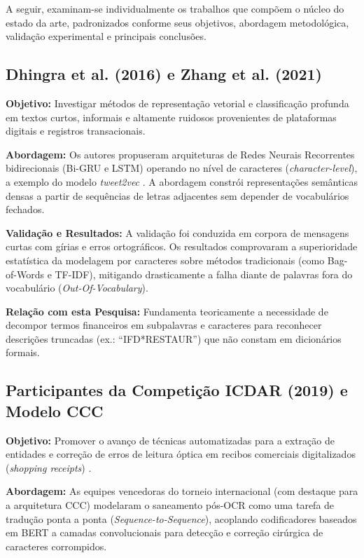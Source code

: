 \documentclass[
	12pt,				
	openright,			
	oneside,			
	a4paper,			
	english,			
	brazil				
	]{abntex2}
\begin{document}
A seguir, examinam-se individualmente os trabalhos que compõem o núcleo do estado da arte, padronizados conforme seus objetivos, abordagem metodológica, validação experimental e principais conclusões.

\subsection{Dhingra et al. (2016) e Zhang et al. (2021)}
\textbf{Objetivo:} Investigar métodos de representação vetorial e classificação profunda em textos curtos, informais e altamente ruidosos provenientes de plataformas digitais e registros transacionais.

\textbf{Abordagem:} Os autores propuseram arquiteturas de Redes Neurais Recorrentes bidirecionais (Bi-GRU e LSTM) operando no nível de caracteres (\textit{character-level}), a exemplo do modelo \textit{tweet2vec} \cite{dhingra2016tweet2vec, zhang2021mineracao}. A abordagem constrói representações semânticas densas a partir de sequências de letras adjacentes sem depender de vocabulários fechados.

\textbf{Validação e Resultados:} A validação foi conduzida em corpora de mensagens curtas com gírias e erros ortográficos. Os resultados comprovaram a superioridade estatística da modelagem por caracteres sobre métodos tradicionais (como Bag-of-Words e TF-IDF), mitigando drasticamente a falha diante de palavras fora do vocabulário (\textit{Out-Of-Vocabulary}). 

\textbf{Relação com esta Pesquisa:} Fundamenta teoricamente a necessidade de decompor termos financeiros em subpalavras e caracteres para reconhecer descrições truncadas (ex.: ``IFD*RESTAUR'') que não constam em dicionários formais.

\subsection{Participantes da Competição ICDAR (2019) e Modelo CCC}
\textbf{Objetivo:} Promover o avanço de técnicas automatizadas para a extração de entidades e correção de erros de leitura óptica em recibos comerciais digitalizados (\textit{shopping receipts}) \cite{icdar2019competition}.

\textbf{Abordagem:} As equipes vencedoras do torneio internacional (com destaque para a arquitetura CCC) modelaram o saneamento pós-OCR como uma tarefa de tradução ponta a ponta (\textit{Sequence-to-Sequence}), acoplando codificadores baseados em BERT \cite{devlin2019bert} a camadas convolucionais para detecção e correção cirúrgica de caracteres corrompidos.
\end{document}
